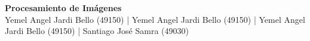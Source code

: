 \documentclass{article}
\begin{document}

\begin{center}

{ \huge \bfseries Procesamiento de Imágenes}\\[0.4cm]

\large Yemel Angel Jardi Bello (49150) |
\large Yemel Angel Jardi Bello (49150) |
\large Yemel Angel Jardi Bello (49150) |
\large Santiago José Samra (49030)\\[0.3cm] 

\end{center}



\begin{abstract}
\par El objetivo del presente artículo es analizar espectralmente una imagen y utilizar la transformada discreta de Fourier para realizar filtrados espaciales. 
\end{abstract}
\end{document}
